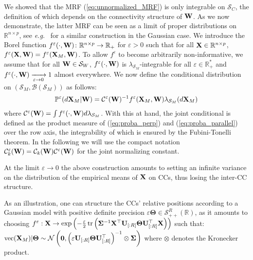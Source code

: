 We showed that the MRF (\ref{eq:unnormalized_MRF}) is only integrable on $\mathcal{S}_{C}$, the definition of which depends on the connectivity structure of ${\mathbf{W}}$. As we now demonstrate, the latter MRF can be seen as a limit of proper distributions on $\mathbb{R}^{n \times p}$, see \textit{e.g.}\ \cite{rue2005gaussian} for a similar construction in the Gaussian case. 
We introduce the Borel function $f^{\varepsilon}(\cdot, {\mathbf{W}}) \colon \mathbb{R}^{n \times p} \to \mathbb{R}_+$ for $\varepsilon > 0$ such that for all $\mathbf{X} \in \mathbb{R}^{n \times p}$, $f^{\varepsilon}(\mathbf{X}, {\mathbf{W}}) = f^{\varepsilon}(\mathbf{X}_{M}, {\mathbf{W}})$. To allow $f^{\varepsilon}$ to become arbitrarily non-informative, we assume that for all ${\mathbf{W}} \in \mathcal{S}_{W}$, $f^\varepsilon(\cdot, {\mathbf{W}})$ is $\lambda_{\mathcal{S}_{M}}$-integrable for all $\varepsilon \in \mathbb{R}^*_+$ and $f^{\varepsilon}(\cdot, {\mathbf{W}}) \xrightarrow[\varepsilon \to 0]{} 1$ almost everywhere.
We now define the conditional distribution on $(\mathcal{S}_{M}, \mathcal{B}(\mathcal{S}_{M}))$ as follows:
\begin{align}\label{eq:proba_parallel}
     \mathbb{P}^{\varepsilon}(d\mathbf{X}_{M}| {\mathbf{W}}) = \mathcal{C}^{\varepsilon}({\mathbf{W}})^{-1} f^{\varepsilon}(\mathbf{X}_{M}, {\mathbf{W}}) \lambda_{\mathcal{S}_{M}}(d\mathbf{X}_{M})
\end{align}
where $\mathcal{C}^{\varepsilon}({\mathbf{W}}) = \int f^{\varepsilon}(\cdot, {\mathbf{W}}) d\lambda_{\mathcal{S}_{M}}$.
With this at hand, the joint conditional is defined as the product measure of (\ref{eq:proba_perp}) and (\ref{eq:proba_parallel}) over the row axis, the integrability of which is ensured by the Fubini-Tonelli theorem. In the following we will use the compact notation $\mathcal{C}^{\varepsilon}_k({\mathbf{W}}) = \mathcal{C}_k({\mathbf{W}})\mathcal{C}^{\varepsilon}({\mathbf{W}})$ for the joint normalizing constant.

\begin{remark}
At the limit $\varepsilon \to 0$ the above construction amounts to setting an infinite variance on the distribution of the empirical means of $\mathbf{X}$ on CCs, thus losing the inter-CC structure. 
\end{remark}

As an illustration, one can structure the CCs' relative positions according to a Gaussian model with positive definite precision $\varepsilon \bm{\Theta} \in \mathcal{S}_{++}^R(\mathbb{R})$, as it amounts to choosing $f^{\varepsilon} : \mathbf{X} \to \exp \left(-\frac{\varepsilon}{2} \operatorname{tr}\left(\mathbf{\Sigma}^{-1}\mathbf{X}^\top\mathbf{U}_{[:R]}  \bm{\Theta}\mathbf{U}^\top_{[:R]} \mathbf{X}\right)\right)$ such that: $\mathrm{vec}(\mathbf{X}_{M}) | \bm{\Theta} \sim \mathcal{N}\left(\bm{0}, \left(\varepsilon \mathbf{U}_{[:R]}  \bm{\Theta}\mathbf{U}^\top_{[:R]}\right)^{-1} \otimes \mathbf{\Sigma}\right)$ where $\otimes$ denotes the Kronecker product.